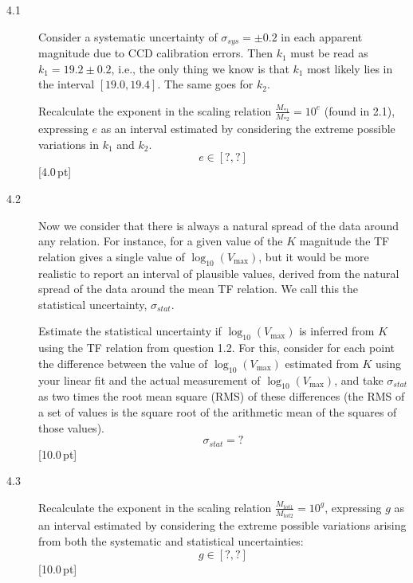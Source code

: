 \begin{description}
\item[4.1] Consider a systematic uncertainty of $\sigma_{sys} = \pm 0.2$ in
  each apparent magnitude due to CCD calibration errors. Then $k_1$ must be
  read as $k_1 = 19.2 \pm 0.2$, i.e., the only thing we know is that $k_1$
  most likely lies in the interval $[19.0, 19.4]$. The same goes for $k_2$.

  Recalculate the exponent in the scaling relation
  $\frac{M_{*1}}{M_{*2}} = 10^e$ (found in 2.1), expressing $e$ as an
  interval estimated by considering the extreme possible variations in $k_1$
  and $k_2$.
  \[ e \in [?, ?] \]
  \hfill[4.0\,pt]
\item[4.2] Now we consider that there is always a natural spread of the data
  around any relation. For instance, for a given value of the $K$ magnitude
  the TF relation gives a single value of $\log_{10}(V_{\max})$, but it would
  be more realistic to report an interval of plausible values, derived from
  the natural spread of the data around the mean TF relation. We call this
  the statistical uncertainty, $\sigma_{stat}$.

  Estimate the statistical uncertainty if $\log_{10}(V_{\max})$ is inferred
  from $K$ using the TF relation from question 1.2. For this, consider for
  each point the difference between the value of $\log_{10}(V_{\max})$
  estimated from $K$ using your linear fit and the actual measurement of
  $\log_{10}(V_{\max})$, and take $\sigma_{stat}$ as two times the root mean
  square (RMS) of these differences (the RMS of a set of values is the square
  root of the arithmetic mean of the squares of those values).
  \[ \sigma_{stat} = ? \]
  \hfill[10.0\,pt]
\item[4.3] Recalculate the exponent in the scaling relation
  $\frac{M_{tot1}}{M_{tot2}} = 10^g$, expressing $g$ as an interval estimated
  by considering the extreme possible variations arising from both the
  systematic and statistical uncertainties:
  \[ g \in [?, ?] \]
  \hfill[10.0\,pt]
\end{description}
